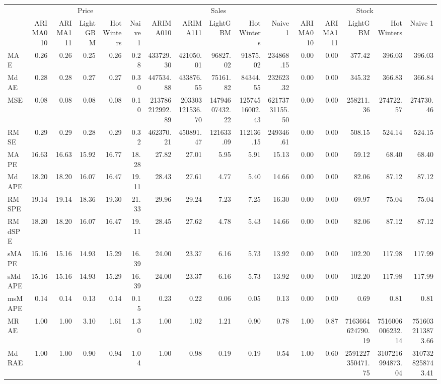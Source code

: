\begin{tabular}{l|rrrrr|rrrrr|rrrrr}
\toprule
 & \multicolumn{5}{c}{Price} & \multicolumn{5}{c}{Sales} & \multicolumn{5}{c}{Stock} \\
 & ARIMA010 & ARIMA111 & LightGBM & Hot Winters & Naive 1 & ARIMA010 & ARIMA111 & LightGBM & Hot Winters & Naive 1 & ARIMA010 & ARIMA111 & LightGBM & Hot Winters & Naive 1 \\
\midrule
MAE & 0.26 & 0.26 & 0.25 & 0.26 & 0.28 & 433729.30 & 421050.01 & 96827.02 & 91875.02 & 234868.15 & 0.00 & 0.00 & 377.42 & 396.03 & 396.03 \\
MdAE & 0.28 & 0.28 & 0.27 & 0.27 & 0.30 & 447534.88 & 433876.55 & 75161.82 & 84344.55 & 232623.32 & 0.00 & 0.00 & 345.32 & 366.83 & 366.84 \\
MSE & 0.08 & 0.08 & 0.08 & 0.08 & 0.10 & 213786212992.89 & 203303121536.70 & 14794607432.22 & 12574516002.43 & 62173731155.50 & 0.00 & 0.00 & 258211.36 & 274722.57 & 274730.46 \\
RMSE & 0.29 & 0.29 & 0.28 & 0.29 & 0.32 & 462370.21 & 450891.47 & 121633.09 & 112136.15 & 249346.61 & 0.00 & 0.00 & 508.15 & 524.14 & 524.15 \\
MAPE & 16.63 & 16.63 & 15.92 & 16.77 & 18.28 & 27.82 & 27.01 & 5.95 & 5.91 & 15.13 & 0.00 & 0.00 & 59.12 & 68.40 & 68.40 \\
MdAPE & 18.20 & 18.20 & 16.07 & 16.47 & 19.11 & 28.43 & 27.61 & 4.77 & 5.40 & 14.66 & 0.00 & 0.00 & 82.06 & 87.12 & 87.12 \\
RMSPE & 19.14 & 19.14 & 18.36 & 19.30 & 21.33 & 29.96 & 29.24 & 7.23 & 7.25 & 16.30 & 0.00 & 0.00 & 69.97 & 75.04 & 75.04 \\
RMdSPE & 18.20 & 18.20 & 16.07 & 16.47 & 19.11 & 28.45 & 27.62 & 4.78 & 5.43 & 14.66 & 0.00 & 0.00 & 82.06 & 87.12 & 87.12 \\
sMAPE & 15.16 & 15.16 & 14.93 & 15.29 & 16.39 & 24.00 & 23.37 & 6.16 & 5.73 & 13.92 & 0.00 & 0.00 & 102.20 & 117.98 & 117.99 \\
sMdAPE & 15.16 & 15.16 & 14.93 & 15.29 & 16.39 & 24.00 & 23.37 & 6.16 & 5.73 & 13.92 & 0.00 & 0.00 & 102.20 & 117.98 & 117.99 \\
msMAPE & 0.14 & 0.14 & 0.13 & 0.14 & 0.15 & 0.23 & 0.22 & 0.06 & 0.05 & 0.13 & 0.00 & 0.00 & 0.69 & 0.81 & 0.81 \\
MRAE & 1.00 & 1.00 & 3.10 & 1.61 & 1.30 & 1.00 & 1.02 & 1.21 & 0.90 & 0.78 & 1.00 & 0.87 & 7163664624790.19 & 7516006006232.14 & 7516032113873.66 \\
MdRAE & 1.00 & 1.00 & 0.90 & 0.94 & 1.04 & 1.00 & 0.98 & 0.19 & 0.19 & 0.54 & 1.00 & 0.60 & 2591227350471.75 & 3107216994873.04 & 3107328258743.41 \\

\end{tabular}

